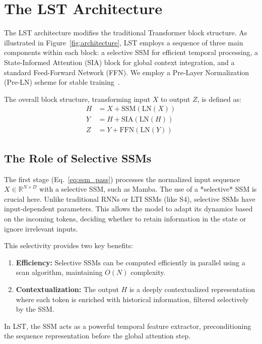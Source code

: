 \documentclass[10pt,twocolumn,letterpaper]{article}
\begin{document}
\section{The LST Architecture}

The LST architecture modifies the traditional Transformer block structure. As illustrated in Figure~\ref{fig:architecture}, LST employs a sequence of three main components within each block: a selective SSM for efficient temporal processing, a State-Informed Attention (SIA) block for global context integration, and a standard Feed-Forward Network (FFN). We employ a Pre-Layer Normalization (Pre-LN) scheme for stable training~\cite{xiong2020layer}.

The overall block structure, transforming input \(X\) to output \(Z\), is defined as:
\begin{align}
H &= X + \text{SSM}(\text{LN}(X)) \label{eq:ssm_pass}\\
Y &= H + \text{SIA}(\text{LN}(H)) \label{eq:sia_pass}\\
Z &= Y + \text{FFN}(\text{LN}(Y)) \label{eq:ffn_pass}
\end{align}

\subsection{The Role of Selective SSMs}

The first stage (Eq.~\ref{eq:ssm_pass}) processes the normalized input sequence \(X\in\mathbb{R}^{N\times D}\) with a selective SSM, such as Mamba. The use of a *selective* SSM is crucial here. Unlike traditional RNNs or LTI SSMs (like S4), selective SSMs have input-dependent parameters. This allows the model to adapt its dynamics based on the incoming tokens, deciding whether to retain information in the state or ignore irrelevant inputs.

This selectivity provides two key benefits:
\begin{enumerate}
    \item \textbf{Efficiency:} Selective SSMs can be computed efficiently in parallel using a scan algorithm, maintaining \(O(N)\) complexity.
    \item \textbf{Contextualization:} The output \(H\) is a deeply contextualized representation where each token is enriched with historical information, filtered selectively by the SSM.
\end{enumerate}
In LST, the SSM acts as a powerful temporal feature extractor, preconditioning the sequence representation before the global attention step.
\end{document}
